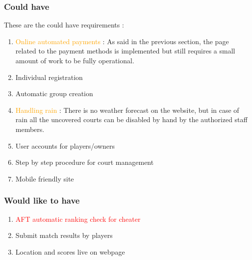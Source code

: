 \subsubsection{Could have}
\label{Could have}

These are the could have requirements :\newline

\begin{enumerate} \itemsep1pt
\item \textcolor{orange} {Online automated payments} : As said in the previous
section, the page related to the payment methods is implemented but still
requires a small amount of work to be fully operational.
\item \textcolor{green!60!black} {Individual registration}
\item \textcolor{green!60!black} {Automatic group creation}
\item \textcolor{orange} {Handling rain} : There is no weather forecast on the
website, but in case of rain all the uncovered courts can be disabled by hand
by the authorized staff members.
\item \textcolor{green!60!black} {User accounts for players/owners}
\item \textcolor{green!60!black} {Step by step procedure for court management}
\item \textcolor{green!60!black} {Mobile friendly site}
\end{enumerate}

\subsubsection{Would like to have}
\label{Would like to have}

\begin{enumerate} \itemsep1pt
\item \textcolor{red} {AFT automatic ranking check for cheater}
\item \textcolor{green!60!black} {Submit match results by players}
\item \textcolor{green!60!black} {Location and scores live on webpage}
\end{enumerate}
